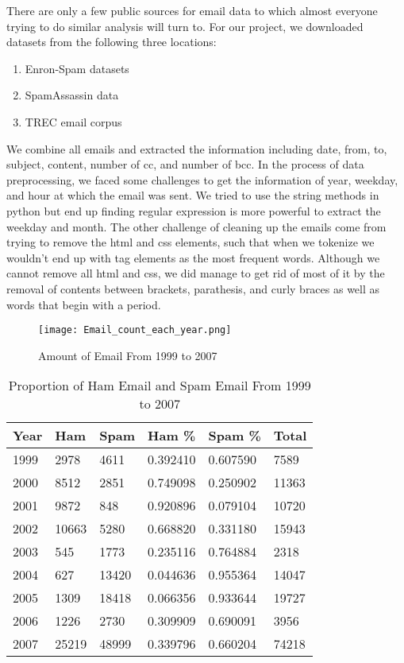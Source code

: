 There are only a few public sources for email data to which almost everyone trying to do similar analysis will turn to. For our project, we downloaded datasets from the following three locations:

\begin{enumerate}
\item Enron-Spam datasets
\item SpamAssassin data
\item TREC email corpus
\end{enumerate} 

We combine all emails and extracted the information including date, from, to, subject, content, number of cc, and number of bcc. In the process of data preprocessing, we faced some challenges to get the information of year, weekday, and hour at which the email was sent. We tried to use the string methods in python but end up finding regular expression is more powerful to extract the weekday and month. The other challenge of cleaning up the emails come from trying to remove the html and css elements, such that when we tokenize we wouldn't end up with tag elements as the most frequent words. Although we cannot remove all html and css, we did manage to get rid of most of it by the removal of contents between brackets, parathesis, and curly braces as well as words that begin with a period. \\

\begin{figure}[H]
\texttt{[image: Email\_count\_each\_year.png]}
\centering
\caption{Amount of Email From 1999 to 2007}
\label{email_every_year}
\end{figure}

\begin{table}[h]
\centering
\caption{Proportion of Ham Email and Spam Email From 1999 to 2007}
\label{proportion_ham_spam}
\begin{tabular}{@{}llllll@{}}
\toprule
Year & Ham   & Spam  & Ham \%   & Spam \%  & Total \\ \midrule
1999 & 2978  & 4611  & 0.392410 & 0.607590 & 7589  \\
2000 & 8512  & 2851  & 0.749098 & 0.250902 & 11363 \\
2001 & 9872  & 848   & 0.920896 & 0.079104 & 10720 \\
2002 & 10663 & 5280  & 0.668820 & 0.331180 & 15943 \\
2003 & 545   & 1773  & 0.235116 & 0.764884 & 2318  \\
2004 & 627   & 13420 & 0.044636 & 0.955364 & 14047 \\
2005 & 1309  & 18418 & 0.066356 & 0.933644 & 19727 \\
2006 & 1226  & 2730  & 0.309909 & 0.690091 & 3956  \\
2007 & 25219 & 48999 & 0.339796 & 0.660204 & 74218 \\ \bottomrule
\end{tabular}
\end{table}

